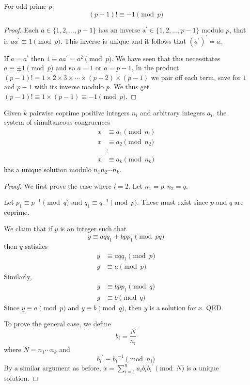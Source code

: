 \begin{theorem} 
For odd prime $p$, 
\begin{equation} (p-1)! \equiv -1 \pmod p \end{equation}
\end{theorem}

\begin{proof}
Each $a\in\{1,2,\dots,p-1\}$ has an inverse a$^\prime\in\{1,2,\dots,p-1\}$ modulo $p$, that is $aa^\prime\equiv1\pmod p$. This inverse is unique and it follows that $(a^\prime)^\prime=a$.

If $a=a^\prime$ then $1\equiv aa^\prime=a^2\pmod p$. We have seen that this necessitates $a\equiv\pm1\pmod p$ and so $a=1$ or $a=p-1$. In the product $(p-1)!=1\times2\times3\times\cdots\times(p-2)\times(p-1)$ we pair off each term, save for $1$ and $p-1$ with its inverse modulo $p$. We thus get $(p-1)!\equiv1\times(p-1)\equiv-1\pmod p$.
\end{proof}

\begin{theorem}
Given $k$ pairwise coprime positive integers $n_i$ and arbitrary integers $a_i$, the system of simultaneous congruences 
\begin{align*} 
x &\equiv a_1 \pmod {n_1} \\ 
x &\equiv a_2 \pmod {n_2} \\ 
&\vdots \\ 
x &\equiv a_k \pmod {n_k} 
\end{align*} 
has a unique solution modulo $n_1 n_2 \cdots n_k$.
\end{theorem}
\begin{proof}
We first prove the case where $i=2$. Let $n_1=p,n_2=q$.

Let $p_1\equiv p^{-1}\pmod q$ and $q_1\equiv q^{-1}\pmod p$. These must exist since $p$ and $q$ are coprime.

We claim that if $y$ is an integer such that
\[y\equiv aqq_1+bpp_1 \pmod {pq}\]
then $y$ satisfies 
\begin{align*}
y &\equiv aqq_1 \pmod p \\
y &\equiv a \pmod p
\end{align*}
Similarly,
\begin{align*}
y &\equiv bpp_1 \pmod q \\
y &\equiv b \pmod q
\end{align*}
Since $y\equiv a\pmod p$ and $y\equiv b\pmod q$, then $y$ is a solution for $x$. QED.

To prove the general case, we define
\[b_i=\frac{N}{n_i}\]
where $N=n_1\cdots n_k$ and
\[{b_i}^\prime\equiv {b_i}^{-1}\pmod{n_i}\]
By a similar argument as before,
${\displaystyle x=\sum_{i=1}^na_ib_i{b_i}^\prime\pmod N}$ is a unique solution.
\end{proof}

